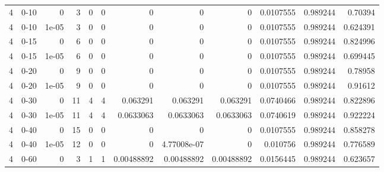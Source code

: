 \begin{tabular}{rlrrrrrrrrrr}
     4 & 0-10   &      0     &           3 &                 0 &                 0 &     0           &     0           &      0           &        0.0107555 &               0.989244 &           0.70394  \\
     4 & 0-10   &      1e-05 &           3 &                 0 &                 0 &     0           &     0           &      0           &        0.0107555 &               0.989244 &           0.624391 \\
     4 & 0-15   &      0     &           6 &                 0 &                 0 &     0           &     0           &      0           &        0.0107555 &               0.989244 &           0.824996 \\
     4 & 0-15   &      1e-05 &           6 &                 0 &                 0 &     0           &     0           &      0           &        0.0107555 &               0.989244 &           0.699445 \\
     4 & 0-20   &      0     &           9 &                 0 &                 0 &     0           &     0           &      0           &        0.0107555 &               0.989244 &           0.78958  \\
     4 & 0-20   &      1e-05 &           9 &                 0 &                 0 &     0           &     0           &      0           &        0.0107555 &               0.989244 &           0.91612  \\
     4 & 0-30   &      0     &          11 &                 4 &                 4 &     0.063291    &     0.063291    &      0.063291    &        0.0740466 &               0.989244 &           0.822896 \\
     4 & 0-30   &      1e-05 &          11 &                 4 &                 4 &     0.0633063   &     0.0633063   &      0.0633063   &        0.0740619 &               0.989244 &           0.922224 \\
     4 & 0-40   &      0     &          15 &                 0 &                 0 &     0           &     0           &      0           &        0.0107555 &               0.989244 &           0.858278 \\
     4 & 0-40   &      1e-05 &          12 &                 0 &                 0 &     0           &     4.77008e-07 &      0           &        0.010756  &               0.989244 &           0.776589 \\
     4 & 0-60   &      0     &           3 &                 1 &                 1 &     0.00488892  &     0.00488892  &      0.00488892  &        0.0156445 &               0.989244 &           0.623657 \\

\end{tabular}
